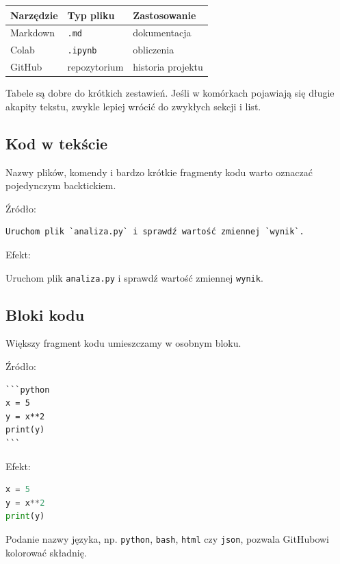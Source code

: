 \documentclass[12pt,a4paper]{article}
\begin{document}
\begin{table}[H]
\centering
\begin{tabular}{lll}
\toprule
\textbf{Narzędzie} & \textbf{Typ pliku} & \textbf{Zastosowanie} \\
\midrule
Markdown & \texttt{.md} & dokumentacja \\
Colab & \texttt{.ipynb} & obliczenia \\
GitHub & repozytorium & historia projektu \\
\bottomrule
\end{tabular}
\end{table}

Tabele są dobre do krótkich zestawień. Jeśli w komórkach pojawiają się długie akapity tekstu, zwykle lepiej wrócić do zwykłych sekcji i list.

\subsection{Kod w tekście}

Nazwy plików, komendy i bardzo krótkie fragmenty kodu warto oznaczać pojedynczym backtickiem.

Źródło:

\begin{lstlisting}
Uruchom plik `analiza.py` i sprawdź wartość zmiennej `wynik`.
\end{lstlisting}

Efekt:

Uruchom plik \texttt{analiza.py} i sprawdź wartość zmiennej \texttt{wynik}.

\subsection{Bloki kodu}

Większy fragment kodu umieszczamy w osobnym bloku.

Źródło:

\begin{lstlisting}
```python
x = 5
y = x**2
print(y)
```
\end{lstlisting}

Efekt:

\begin{lstlisting}[language=Python]
x = 5
y = x**2
print(y)
\end{lstlisting}

Podanie nazwy języka, np. \texttt{python}, \texttt{bash}, \texttt{html} czy \texttt{json}, pozwala GitHubowi kolorować składnię.
\end{document}
